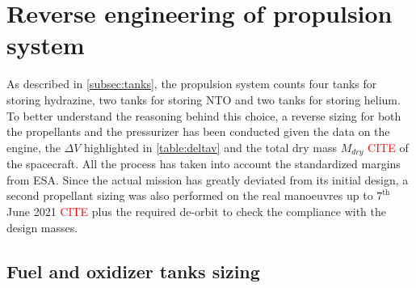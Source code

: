 \section{Reverse engineering of propulsion system}
\label{sec:reverse_prop}

As described in \autoref{subsec:tanks}, the propulsion system counts four tanks for storing hydrazine, two tanks for storing NTO and two tanks for storing helium.
To better understand the reasoning behind this choice, a reverse sizing for both the propellants and the pressurizer has been conducted given the data on the engine, the $\Delta V$ highlighted in \autoref{table:deltav} and the total dry mass $M_{dry}$ \textcolor{red}{CITE} of the spacecraft.
All the process has taken into account the standardized margins from ESA. \cite{esa_margins}
Since the actual mission has greatly deviated from its initial design, a second propellant sizing was also performed on the real manoeuvres up to $7^{\textrm{th}}$ June 2021 \textcolor{red}{CITE} plus the required de-orbit to check the compliance with the design masses.

\subsection{Fuel and oxidizer tanks sizing}
\label{subsec:fuel_ox_sizing}

